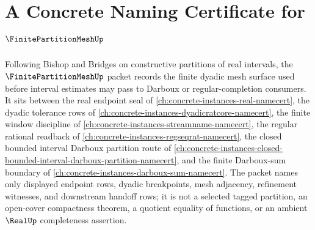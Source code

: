 \chapter{A Concrete Naming Certificate for $\FinitePartitionMeshUp$}
\label{ch:concrete-instances-finite-partition-mesh-namecert}

Following Bishop and Bridges on constructive partitions of real intervals, the $\FinitePartitionMeshUp$ packet records the finite dyadic mesh surface used before interval estimates may pass to Darboux or regular-completion consumers. It sits between the real endpoint seal of \autoref{ch:concrete-instances-real-namecert}, the dyadic tolerance rows of \autoref{ch:concrete-instances-dyadicratcore-namecert}, the finite window discipline of \autoref{ch:concrete-instances-streamname-namecert}, the regular rational readback of \autoref{ch:concrete-instances-regseqrat-namecert}, the closed bounded interval Darboux partition route of \autoref{ch:concrete-instances-closed-bounded-interval-darboux-partition-namecert}, and the finite Darboux-sum boundary of \autoref{ch:concrete-instances-darboux-sum-namecert}. The packet names only displayed endpoint rows, dyadic breakpoints, mesh adjacency, refinement witnesses, and downstream handoff rows; it is not a selected tagged partition, an open-cover compactness theorem, a quotient equality of functions, or an ambient $\RealUp$ completeness assertion.

